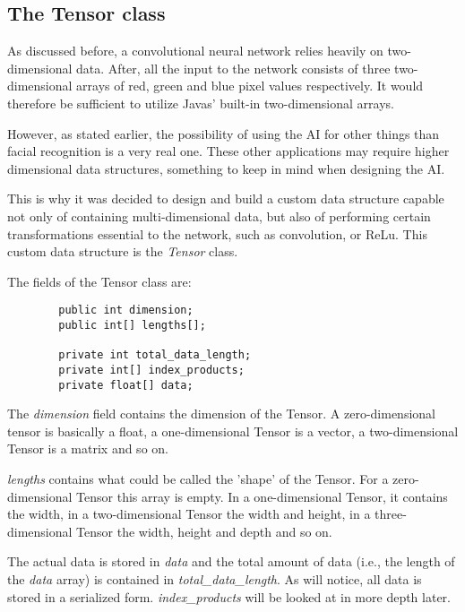 \documentclass[12pt, titlepage]{article}
\begin{document}
		\subsection{The Tensor class} \label{Tensor}
		As discussed before, a convolutional neural network relies heavily on two-dimensional data. After, all the input to the network consists of three two-dimensional arrays of red, green and blue pixel values respectively. It would therefore be sufficient to utilize Javas' built-in two-dimensional arrays.
		
		However, as stated earlier, the possibility of using the AI for other things than facial recognition is a very real one. These other applications may require higher dimensional data structures, something to keep in mind when designing the AI.
		
		This is why it was decided to design and build a custom data structure capable not only of containing multi-dimensional data, but also of performing certain transformations essential to the network, such as convolution, or ReLu. This custom data structure is the \textit{Tensor} class.
		
		The fields of the Tensor class are:
		\begin{lstlisting}
		public int dimension;
		public int[] lengths[];
		
		private int total_data_length;
		private int[] index_products;
		private float[] data;
		\end{lstlisting}
		The \textit{dimension} field contains the dimension of the Tensor. A zero-dimensional tensor is basically a float, a one-dimensional Tensor is a vector, a two-dimensional Tensor is a matrix and so on.
		
		\textit{lengths} contains what could be called the 'shape' of the Tensor. For a zero-dimensional Tensor this array is empty. In a one-dimensional Tensor, it contains the width, in a two-dimensional Tensor the width and height, in a three-dimensional Tensor the width, height and depth and so on.
		
		The actual data is stored in \textit{data} and the total amount of data (i.e., the length of the \textit{data} array) is contained in \textit{total\_data\_length}. As  will notice, all data is stored in a serialized form. \textit{index\_products} will be looked at in more depth later.
		
\end{document}
